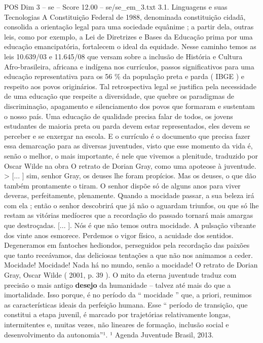 \begin{textsample}{POS Dim 3 – se – Score 12.00 – se/se\_em\_3.txt}  \label{ex:f3_pos_167}
3.1.
Linguagens e suas Tecnologias A Constituição Federal de 1988, denominada constituição cidadã, consolida a orientação legal para uma sociedade equânime ; a partir dela, outras leis, como por exemplo, a Lei de Diretrizes e Bases da Educação prima por uma educação emancipatória, fortalecem o ideal da equidade.
Nesse caminho temos as leis 10.639/03 e 11.645/08 que versam sobre a inclusão de História e Cultura Afro-brasileira, africana e indígena nos currículos, passos significativos para uma educação representativa para os 56 \% da população preta e parda ( IBGE ) e respeito aos povos originários.
Tal retrospectiva legal se justifica pela necessidade de uma educação que respeite a diversidade, que quebre os paradigmas de discriminação, apagamento e silenciamento dos povos que formaram e sustentam o nosso país.
Uma educação de qualidade precisa falar de todos, os jovens estudantes de maioria preta ou parda devem estar representados, eles devem se perceber e se enxergar na escola.
E o currículo é o documento que precisa fazer essa demarcação para as diversas juventudes, visto que esse momento da vida é, senão o melhor, o mais importante, é nele que vivemos a plenitude, traduzido por Oscar Wilde na obra O retrato de Dorian Gray, como uma apoteose à juventude. > [... ] sim, senhor Gray, os deuses lhe foram propícios.
Mas os deuses, o que dão também prontamente o tiram.
O senhor dispõe só de alguns anos para viver deveras, perfeitamente, plenamente.
Quando a mocidade passar, a sua beleza irá com ela ; então o senhor descobrirá que já não o aguardam triunfos, ou que só lhe restam as vitórias medíocres que a recordação do passado tornará mais amargas que destroçadas. [... ].
Nós é que não temos outra mocidade.
A pulsação vibrante dos vinte anos esmorece.
Perdemos o vigor físico, a acuidade dos sentidos.
Degeneramos em fantoches hediondos, perseguidos pela recordação das paixões que tanto receávamos, das deliciosas tentações a que não nos animamos a ceder.
Mocidade!
Mocidade!
Nada há no mundo, senão a mocidade!
O retrato de Dorian Gray, Oscar Wilde ( 2001, p. 39 ).
O mito da eterna juventude traduz com precisão o mais antigo \textbf{desejo} da humanidade – talvez até mais do que a imortalidade.
Isso porque, é no período da “ mocidade ” que, a priori, reunimos as características ideais da perfeição humana.
Esse “ período de transição, que constitui a etapa juvenil, é marcado por trajetórias relativamente longas, intermitentes e, muitas vezes, não lineares de formação, inclusão social e desenvolvimento da autonomia”¹. ¹ Agenda Juventude Brasil, 2013.

\end{textsample}
